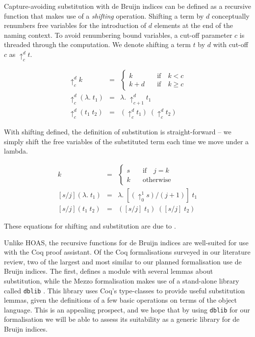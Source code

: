\documentclass[]{unswthesis}
\newcommand{\SSPHS}{\text{SSPHS }}
\begin{document}
Capture-avoiding substitution with de Bruijn indices can be defined as a recursive function that makes use of a \textit{shifting} operation. Shifting a term by $d$ conceptually renumbers free variables for the introduction of $d$ elements at the end of the naming context. To avoid renumbering bound variables, a cut-off parameter $c$ is threaded through the computation. We denote shifting a term $t$ by $d$ with cut-off $c$ as $\uparrow^d_c t$.

\begin{eqnarray*}
\uparrow^d_c k & = &
	\begin{cases}
	k \quad & \text{if} \quad k < c \\
	k + d \quad & \text{if} \quad k \geq c
	\end{cases}\\
\uparrow^d_c (\lambda. \; t_1) & = & \lambda. \; \uparrow^d_{c + 1} t_1\\
\uparrow^d_c (t_1 \; t_2) & = & (\uparrow^d_c t_1) \; (\uparrow^d_c t_2)
\end{eqnarray*}

With shifting defined, the definition of substitution is straight-forward -- we simply shift the free variables of the substituted term each time we move under a lambda.

\begin{eqnarray*}
[s/j]k & = &
	\begin{cases}
	s \quad & \text{if} \quad j = k \\
	k \quad & \text{otherwise}
	\end{cases}\\
\left[s/j\right](\lambda. \; t_1) & = & \lambda. \; [(\uparrow^1_0 s)/(j + 1)] \; t_1\\
\left[s/j\right](t_1 \; t_2) & = & ([s/j] \; t_1) \; ([s/j] \; t_2)
\end{eqnarray*}

These equations for shifting and substitution are due to \cite{tapl}.

Unlike HOAS, the recursive functions for de Bruijn indices are well-suited for use with the Coq proof assistant. Of the Coq formalisations surveyed in our literature review, two of the largest and most similar to our planned formalisation use de Bruijn indices. The first, \SSPHS \cite{pottier13} defines a module with several lemmas about substitution, while the Mezzo formalisation \cite{mezzo14} makes use of a stand-alone library called \texttt{dblib} \cite{dblib13}. This library uses Coq's type-classes to provide useful substitution lemmas, given the definitions of a few basic operations on terms of the object language. This is an appealing prospect, and we hope that by using \texttt{dblib} for our formalisation we will be able to assess its suitability as a generic library for de Bruijn indices.
\end{document}
